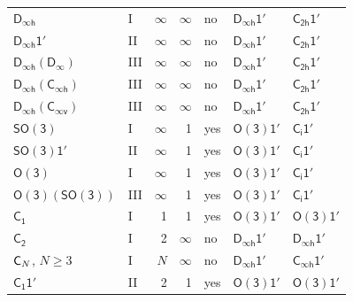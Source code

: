 \documentclass[10pt,a4paper]{article}
\makeatletter
\def\grouprule#1#2{\noalign{\marks\LTgroupmarks{\the\belowrulesep}\nobreak\vskip#1%
  \vskip\aboverulesep}\multispan\LT@cols\unskip{\leaders\hrule\@height#2\hfill\kern\z@}\cr
  \noalign{\penalty\LTrulebreak\vskip\belowrulesep\global\@lastruleclass\z@}}
\numberwithin{equation}{section}
\newcommand{\grp}[1]{\mathsf{#1}}
\makeatother
\begin{document}
{\begin{longtable}{@{}llrrlll@{}}
\href{../../../rotation/data/pdf/Dinfh.pdf}{$\grp{D_{\infty h}}$} & I & $\infty$ & $\infty$ & no & \href{Dinfh-1p.pdf}{$\grp{D_{\infty h}1'}$} & \href{C2h-1p.pdf}{$\grp{C_{2h}1'}$}\\
\href{Dinfh-1p.pdf}{$\grp{D_{\infty h}1'}$} & II & $\infty$ & $\infty$ & no & \href{Dinfh-1p.pdf}{$\grp{D_{\infty h}1'}$} & \href{C2h-1p.pdf}{$\grp{C_{2h}1'}$}\\
\href{Dinfh-Dinf.pdf}{$\grp{D_{\infty h}}(\grp{D_{\infty}})$} & III & $\infty$ & $\infty$ & no & \href{Dinfh-1p.pdf}{$\grp{D_{\infty h}1'}$} & \href{C2h-1p.pdf}{$\grp{C_{2h}1'}$}\\
\href{Dinfh-Cinfh.pdf}{$\grp{D_{\infty h}}(\grp{C_{\infty h}})$} & III & $\infty$ & $\infty$ & no & \href{Dinfh-1p.pdf}{$\grp{D_{\infty h}1'}$} & \href{C2h-1p.pdf}{$\grp{C_{2h}1'}$}\\
\href{Dinfh-Cinfv.pdf}{$\grp{D_{\infty h}}(\grp{C_{\infty v}})$} & III & $\infty$ & $\infty$ & no & \href{Dinfh-1p.pdf}{$\grp{D_{\infty h}1'}$} & \href{C2h-1p.pdf}{$\grp{C_{2h}1'}$}\\
\href{../../../rotation/data/pdf/SO3.pdf}{$\grp{SO(3)}$} & I & $\infty$ & 1 & yes & \href{O3-1p.pdf}{$\grp{O(3)1'}$} & \href{S2-1p.pdf}{$\grp{C_{i}1'}$}\\
\href{SO3-1p.pdf}{$\grp{SO(3)1'}$} & II & $\infty$ & 1 & yes & \href{O3-1p.pdf}{$\grp{O(3)1'}$} & \href{S2-1p.pdf}{$\grp{C_{i}1'}$}\\
\href{../../../rotation/data/pdf/O3.pdf}{$\grp{O(3)}$} & I & $\infty$ & 1 & yes & \href{O3-1p.pdf}{$\grp{O(3)1'}$} & \href{S2-1p.pdf}{$\grp{C_{i}1'}$}\\
\href{O3-SO3.pdf}{$\grp{O(3)}(\grp{SO(3)})$} & III & $\infty$ & 1 & yes & \href{O3-1p.pdf}{$\grp{O(3)1'}$} & \href{S2-1p.pdf}{$\grp{C_{i}1'}$}\\
\grouprule{0pt}{\lightrulewidth}
\href{../../../rotation/data/pdf/C1.pdf}{$\grp{C_{1}}$} & I & 1 & 1 & yes & \href{O3-1p.pdf}{$\grp{O(3)1'}$} & \href{O3-1p.pdf}{$\grp{O(3)1'}$}\\
\href{../../../rotation/data/pdf/C2.pdf}{$\grp{C_{2}}$} & I & 2 & $\infty$ & no & \href{Dinfh-1p.pdf}{$\grp{D_{\infty h}1'}$} & \href{Dinfh-1p.pdf}{$\grp{D_{\infty h}1'}$}\\
$\grp{C_{\mathnormal{N}}}$, $N \ge 3$ & I & $N$ & $\infty$ & no & \href{Dinfh-1p.pdf}{$\grp{D_{\infty h}1'}$} & \href{Cinfh-1p.pdf}{$\grp{C_{\infty h}1'}$}\\
\href{C1-1p.pdf}{$\grp{C_{1}1'}$} & II & 2 & 1 & yes & \href{O3-1p.pdf}{$\grp{O(3)1'}$} & \href{O3-1p.pdf}{$\grp{O(3)1'}$}\\

\end{longtable}}
\end{document}

